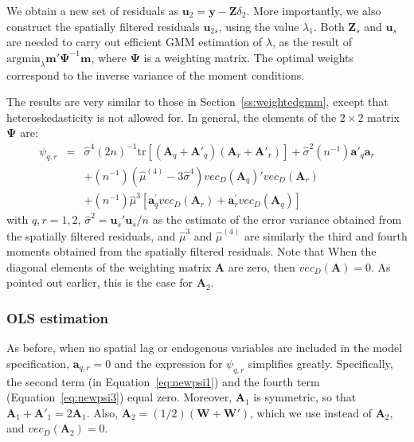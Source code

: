 \documentclass{article}
\begin{document}
We obtain a new set of residuals as $\mathbf{u}_2 = \mathbf{y} - \mathbf{Z} \delta_2$.
More importantly, we also construct the spatially filtered residuals $\mathbf{u}_{2s}$, using
the value $\lambda_1$. Both $\mathbf{Z}_s$ and $\mathbf{u}_s$ are needed to carry out
efficient GMM estimation of $\lambda$, as the result of 
 $\mbox{argmin}_\lambda \mathbf{m'}\mathbf{\mathbf{\Psi}}^{-1} \mathbf{m}$, where $\mathbf{\Psi}$ is a weighting matrix.
The optimal weights correspond to the inverse variance of the moment conditions.

The results are very similar to those in Section~\ref{ss:weightedgmm}, except that 
heteroskedasticity is not allowed for. In general, the elements of the $2 \times 2$ matrix $\mathbf{\Psi}$ are:
\begin{eqnarray}
\psi_{q,r} &=& \hat{\sigma}^4 (2n)^{-1} \mbox{tr} [ (\mathbf{A}_q + \mathbf{A'}_q )  (\mathbf{A}_r + \mathbf{A'}_r )] + \hat{\sigma}^2 (n^{-1}) \mathbf{a'}_q \mathbf{a}_r \label{eq:newpsi1}\\
&& + (n^{-1}) (\hat{\mu}^{(4)} - 3 \hat{\sigma}^4) vec_D(\mathbf{A}_q)'vec_D (\mathbf{A}_r)  \label{eq:newpsi2}\\
&& + (n^{-1}) \hat{\mu}^{3} [ \mathbf{a}_q^{'} vec_D(\mathbf{A}_r) +  \mathbf{a}_r^{'} vec_D(\mathbf{A}_q) ] \label{eq:newpsi3}
\end{eqnarray}
with $q, r = 1, 2$, $\hat{\sigma}^2 = \mathbf{u}_s'\mathbf{u}_s / n$ as the 
estimate of the error variance obtained from the spatially filtered residuals,
and $\hat{\mu}^{3}$ and $\hat{\mu}^{(4)}$ are similarly the third and fourth moments
obtained from the spatially filtered residuals. Note that When the diagonal elements of the weighting matrix $\mathbf{A}$ are zero, 
then  $vec_D (\mathbf{A}) = 0$. As pointed out earlier, this is the case for $\mathbf{A}_2$.




\subsubsection{OLS estimation}
As before, when no spatial lag or endogenous variables are included in the
model specification, $\mathbf{a}_{q,r} = 0$ and the expression for $\psi_{q,r}$ simplifies greatly.
Specifically, the second term (in Equation~\ref{eq:newpsi1}) and the fourth term (Equation~\ref{eq:newpsi3}) equal zero.
Moreover,
$\mathbf{A}_1$ is symmetric, so that $\mathbf{A}_1 + \mathbf{A'}_1 = 2 \mathbf{A}_1$.
Also, $\mathbf{A}_2 = (1/2) (\mathbf{W} + \mathbf{W'} )$, which we use instead of $\mathbf{A}_2$,
and $vec_D (\mathbf{A}_2) = 0$.
\end{document}
